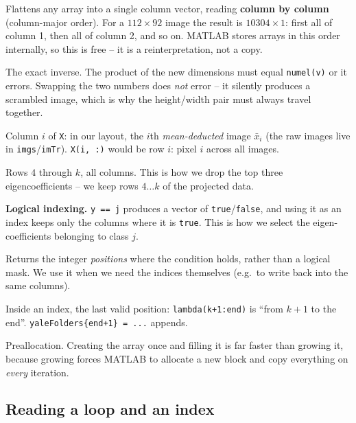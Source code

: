 \documentclass[11pt]{article}
\theoremstyle{definition}
\theoremstyle{remark}
\begin{document}
\begin{description}[leftmargin=*,style=nextline]
\item[\texttt{im(:)}] Flattens any array into a single column vector, reading
  \textbf{column by column} (column-major order). For a $112\times92$ image the
  result is $10304\times1$: first all of column 1, then all of column 2, and so on.
  MATLAB stores arrays in this order internally, so this is free -- it is a
  reinterpretation, not a copy.
\item[\texttt{reshape(v, 112, 92)}] The exact inverse. The product of the new
  dimensions must equal \texttt{numel(v)} or it errors. Swapping the two numbers
  does \emph{not} error -- it silently produces a scrambled image, which is why the
  height/width pair must always travel together.
\item[\texttt{X(:, i)}] Column $i$ of \texttt{X}: in our layout, the $i$th
  \emph{mean-deducted} image $\bar{x}_i$ (the raw images live in
  \texttt{imgs}/\texttt{imTr}). \texttt{X(i, :)} would be row $i$: pixel $i$
  across all images.
\item[\texttt{X(4:k, :)}] Rows $4$ through $k$, all columns. This is how we drop
  the top three eigencoefficients -- we keep rows $4\ldots k$ of the projected
  data.
\item[\texttt{Alpha(:, y == j)}] \textbf{Logical indexing.} \texttt{y == j}
  produces a vector of \texttt{true}/\texttt{false}, and using it as an index keeps
  only the columns where it is \texttt{true}. This is how we select the
  eigen-coefficients belonging to class $j$.
\item[\texttt{find(y == i)}] Returns the integer \emph{positions} where the
  condition holds, rather than a logical mask. We use it when we need the indices
  themselves (e.g.\ to write back into the same columns).
\item[\texttt{end}] Inside an index, the last valid position: \texttt{lambda(k+1:end)}
  is ``from $k+1$ to the end''. \texttt{yaleFolders\{end+1\} = ...} appends.
\item[\texttt{zeros(d, N)}] Preallocation. Creating the array once and filling it is
  far faster than growing it, because growing forces MATLAB to allocate a new block
  and copy everything on \emph{every} iteration.
\end{description}

\subsection{Reading a loop and an index}
\end{document}

